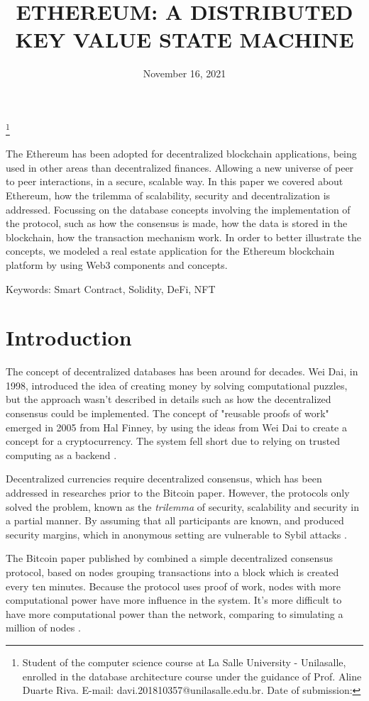 \documentclass[
    article, 
    12pt,				%
	oneside,			%
	a4paper,			%
	chapter=TITLE,		%
	section=TITLE,		%
	english,			%
	english,				%
	sumario=tradicional
]{abntex2}
\date{November 16, 2021}
\title{ \textbf{\uppercase{Ethereum: a distributed key value state machine}}}
\makeatletter
\renewcommand{\imprimirautor}{
  \begin{flushright}
   \theauthor
   \footnote{Student of the computer science course at La Salle University - Unilasalle, enrolled in the database architecture course under the guidance of Prof. Aline Duarte Riva. E-mail: davi.201810357@unilasalle.edu.br. Date of submission: \thedate }
  \end{flushright}
}
\makeatother
\begin{document}
 


\thetitle

\imprimirautor


\begin{resumo}
 The Ethereum has been adopted for decentralized blockchain applications, being used in other areas than decentralized finances.
 Allowing a new universe of peer to peer interactions, in a secure, scalable way.
 In this paper we covered about Ethereum, how the trilemma of scalability, security and decentralization is addressed.
 Focussing on the database concepts involving the implementation of the protocol, such as how the consensus is made, how the data is stored in the blockchain, how the transaction mechanism work.
 In order to better illustrate the concepts, we modeled a real estate application for the Ethereum blockchain platform by using Web3 components and concepts.
 
 \vspace{\onelineskip}
 Keywords: Smart Contract, Solidity, DeFi, NFT
\end{resumo}


\section{Introduction}

The concept of decentralized databases has been around for decades.
Wei Dai, in 1998, introduced the idea of creating money by solving computational puzzles, but the approach wasn't described in details such as how the decentralized consensus could be implemented.
The concept of "reusable proofs of work" emerged in 2005 from Hal Finney, by using the ideas from Wei Dai to create a concept for a cryptocurrency. 
The system fell short due to relying on trusted computing as a backend \cite{buterin_eth_whitepaper_2013}.

Decentralized currencies require decentralized consensus, which has been addressed in researches prior to the Bitcoin paper.
However, the protocols only solved the problem, known as the \textit{trilemma} of security, scalability and security in a partial manner.
By assuming that all participants are known, and produced security margins, which in anonymous setting are vulnerable to Sybil attacks \cite{buterin_eth_whitepaper_2013}.

The Bitcoin paper published by \citeauthor{nakamoto_bitcoin_2008} combined a simple decentralized consensus protocol, based on nodes grouping transactions into a block which is created every ten minutes.
Because the protocol uses proof of work, nodes with more computational power have more influence in the system.
It's more difficult to have more computational power than the network, comparing to simulating a million of nodes \cite{buterin_eth_whitepaper_2013}.
\end{document}
